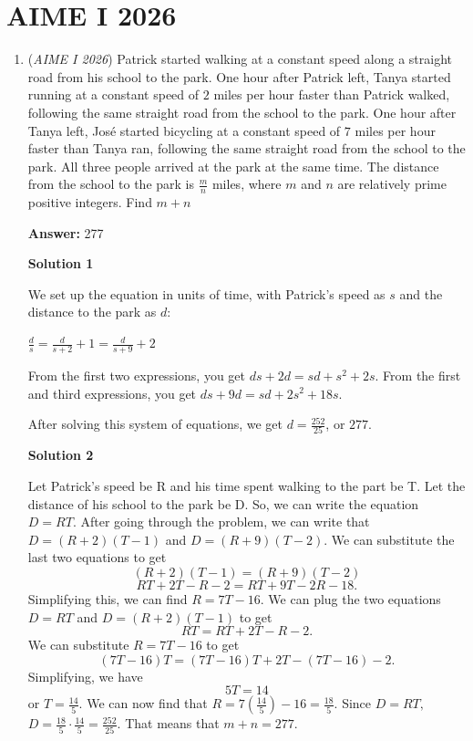 \section{AIME I 2026}
        \begin{enumerate}
        	\item (\textit{AIME I 2026}) Patrick started walking at a constant speed along a straight road from his school to the park. One hour after Patrick left, Tanya started running at a constant speed of $2$ miles per hour faster than Patrick walked, following the same straight road from the school to the park. One hour after Tanya left, José started bicycling at a constant speed of $7$ miles per hour faster than Tanya ran, following the same straight road from the school to the park. All three people arrived at the park at the same time. The distance from the school to the park is $\frac{m}{n}$ miles, where $m$ and $n$ are relatively prime positive integers. Find $m+n$

 \textbf{Answer: }277



\textbf{Solution 1}

We set up the equation in units of time, with Patrick's speed as $s$ and the distance to the park as $d$:

 $\frac{d}{s} = \frac{d}{s+2} + 1 = \frac{d}{s+9} + 2$

 From the first two expressions, you get $ds + 2d = sd + s^2 + 2s$. From the first and third expressions, you get $ds + 9d = sd + 2s^2 + 18s$.

 After solving this system of equations, we get $d = \frac{252}{25}$, or $\boxed{277}$.

 



\textbf{Solution 2}

Let Patrick's speed be R and his time spent walking to the part be T. Let the distance of his school to the park be D. So, we can write the equation $D=RT.$ After going through the problem, we can write that $D=(R+2)(T-1)$ and $D=(R+9)(T-2).$ We can substitute the last two equations to get 
 \[(R+2)(T-1)=(R+9)(T-2)\] 
 \[RT+2T-R-2=RT+9T-2R-18.\] Simplifying this, we can find $R=7T-16.$ We can plug the two equations $D=RT$ and $D=(R+2)(T-1)$ to get 
 \[RT=RT+2T-R-2.\] We can substitute $R=7T-16$ to get 
 \[(7T-16)T=(7T-16)T+2T-(7T-16)-2.\] Simplifying, we have 
 \[5T=14\] or $T=\frac{14}{5}.$ We can now find that $R=7\left(\frac{14}{5} \right)-16=\frac{18}{5}.$ Since $D=RT,$ $D=\frac{18}{5} \cdot \frac{14}{5}=\frac{252}{25}.$ That means that $m+n=\boxed{277}.$





\end{enumerate}

